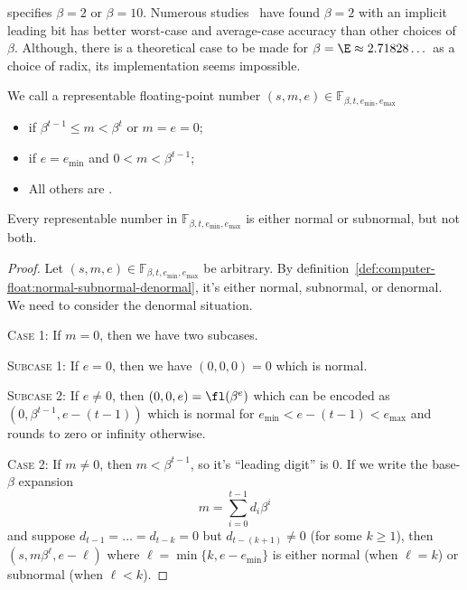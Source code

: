 \begin{rmk}
   specifies $\beta=2$ or $\beta=10$. Numerous studies~\cite{DBLP:journals/corr/abs-1004-3374,10.1145/363235.363240,5009112,10.1145/362003.362013,4039164}
have found $\beta=2$ with an implicit leading bit has better worst-case
and average-case accuracy than other choices of $\beta$. Although, there
is a theoretical case to be made for $\beta=\E\approx2.71828\dots$ as a
choice of radix, its implementation seems impossible.
\end{rmk}


\begin{defn}\label{def:computer-float:normal-subnormal-denormal}
We call a representable floating-point number $(s,m,e)\in\mathbb{F}_{\beta,t,e_{\text{min}},e_{\text{max}}}$
\begin{itemize}
\item{} if $\beta^{t-1}\leq m<\beta^{t}$ or $m=e=0$;
\item{} if $e=e_{\text{min}}$ and $0<m<\beta^{t-1}$;
\item All others are .
\end{itemize}
\end{defn}


\begin{thm}
  Every representable number in $\mathbb{F}_{\beta,t,e_{\text{min}},e_{\text{max}}}$
  is either normal or subnormal, but not both.
\end{thm}
\begin{proof}
  Let  $(s,m,e)\in\mathbb{F}_{\beta,t,e_{\text{min}},e_{\text{max}}}$ be
  arbitrary. By
  definition~\ref{def:computer-float:normal-subnormal-denormal},
  it's either normal, subnormal, or denormal. We need to consider the
  denormal situation.

  \textsc{Case 1:} If $m=0$, then we have two subcases.

  {}\quad\textsc{Subcase 1:} If $e=0$, then we have $(0,0,0)=0$ which is
  normal.

  {}\quad\textsc{Subcase 2:} If $e\neq0$, then $(0,0,e)=\fl(\beta^{e})$
  which can be encoded as $(0,\beta^{t-1}, e-(t-1))$ which is normal for
  $e_{\text{min}}<e-(t-1)<e_{\text{max}}$ and rounds to zero or infinity
  otherwise.

  \textsc{Case 2:} If $m\neq0$, then $m<\beta^{t-1}$, so it's ``leading
  digit'' is 0. If we write the base-$\beta$ expansion
  \begin{equation}
    m=\sum^{t-1}_{i=0}d_{i}\beta^{i}
  \end{equation}
  and suppose $d_{t-1}=\dots=d_{t-k}=0$ but $d_{t-(k+1)}\neq0$ (for some
  $k\geq1$), then $(s,m\beta^{\ell},e-\ell)$ where $\ell=\min\{k,e-e_{\text{min}}\}$
  is either normal (when $\ell=k$) or subnormal (when $\ell<k$).
\end{proof}

